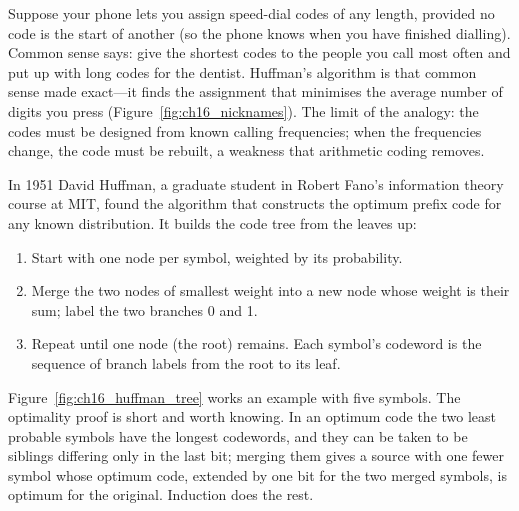 \begin{analogy}
Suppose your phone lets you assign speed-dial codes of any length, provided no code is the
start of another (so the phone knows when you have finished dialling). Common sense says: give
the shortest codes to the people you call most often and put up with long codes for the dentist.
Huffman's algorithm is that common sense made exact---it finds the assignment that minimises
the average number of digits you press (Figure~\ref{fig:ch16_nicknames}). The limit of the
analogy: the codes must be designed from known calling frequencies; when the frequencies change,
the code must be rebuilt, a weakness that arithmetic coding removes.
\end{analogy}

In 1951 David Huffman, a graduate student in Robert Fano's information theory course at MIT,
found the algorithm that constructs the optimum prefix code for any known distribution. It builds
the code tree from the leaves up:
\begin{enumerate}[nosep]
\item Start with one node per symbol, weighted by its probability.
\item Merge the two nodes of smallest weight into a new node whose weight is their sum; label the
two branches 0 and 1.
\item Repeat until one node (the root) remains. Each symbol's codeword is the sequence of branch
labels from the root to its leaf.
\end{enumerate}
Figure~\ref{fig:ch16_huffman_tree} works an example with five symbols. The optimality proof is
short and worth knowing. In an optimum code the two least probable symbols have the longest
codewords, and they can be taken to be siblings differing only in the last bit; merging them
gives a source with one fewer symbol whose optimum code, extended by one bit for the two merged
symbols, is optimum for the original. Induction does the rest.


